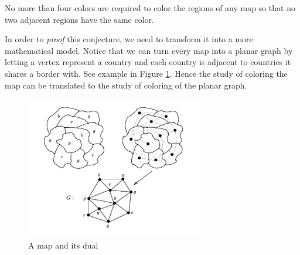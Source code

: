 \begin{conjecture}
  No more than four colors are required to color the regions of
  any map so that no two adjacent regions have the same color.
\end{conjecture}

In order to \textit{proof} this conjecture, we need to transform
it into a more mathematical model. Notice that we can turn every
map into a planar graph by letting a vertex represent a country
and each country is adjacent to countries it shares a border
with. See example in Figure \ref{fig:map-and-dual}. Hence the 
study of coloring the map can be translated to the study of
coloring of the planar graph.

\begin{figure}[ht]
  \begin{center}
    \includegraphics[width=0.69\textwidth]{figures/l15/map-and-dual}
  \end{center}
  \caption{A map and its dual}
  \label{fig:map-and-dual}
\end{figure}


